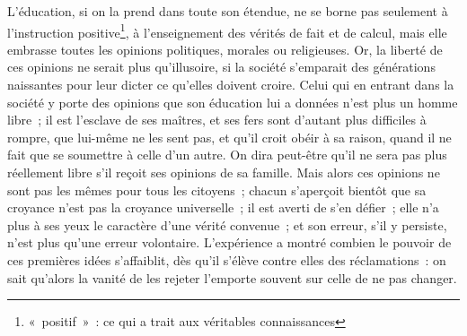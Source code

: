 	{L'éducation, si on la prend dans toute son étendue, ne se borne pas seulement à l'instruction positive\footnote{«~positif~»~: ce qui a trait aux véritables connaissances}, à l'enseignement des vérités de fait et de calcul, mais elle embrasse toutes les opinions politiques, morales ou religieuses. Or, la liberté de ces opinions ne serait plus qu'illusoire, si la société s'emparait des générations naissantes pour leur dicter ce qu'elles doivent croire. Celui qui en entrant dans la société y porte des opinions que son éducation lui a données n'est plus un homme libre~; il est l'esclave de ses maîtres, et ses fers sont d'autant plus difficiles à rompre, que lui-même ne les sent pas, et qu'il croit obéir à sa raison, quand il ne fait que se soumettre à celle d'un autre. On dira peut-être qu'il ne sera pas plus réellement libre s'il reçoit ses opinions de sa famille. Mais alors ces opinions ne sont pas les mêmes pour tous les citoyens~; chacun s'aperçoit bientôt que sa croyance n'est pas la croyance universelle~; il est averti de s'en défier~; elle n'a plus à ses yeux le caractère d'une vérité convenue~; et son erreur, s'il y persiste, n'est plus qu'une erreur volontaire. L'expérience a montré combien le pouvoir de ces premières idées s'affaiblit, dès qu'il s'élève contre elles des réclamations~: on sait qu'alors la vanité de les rejeter l'emporte souvent sur celle de ne pas changer.
	}


